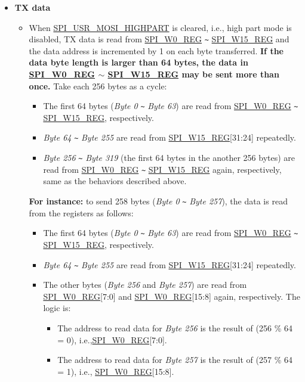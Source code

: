 \documentclass[main\_\_EN.tex]{subfiles}
\begin{document}
\begin{itemize}
    \item \textbf{TX data}
    \begin{itemize}
        \item When \hyperref[fielddesc:SPIUSRMOSIHIGHPART]{SPI\_USR\_MOSI\_HIGHPART} is cleared, i.e., high part mode is disabled, TX data is read from \hyperref[regdesc:SPIW0REG]{SPI\_W0\_REG} \verb+~+ \hyperref[regdesc:SPIW0REG]{SPI\_W15\_REG} and the data address is incremented by 1 on each byte transferred. \textbf{If the data byte length is larger than 64 bytes, the data in \hyperref[regdesc:SPIW0REG]{SPI\_W0\_REG} $\sim$ \hyperref[regdesc:SPIW0REG]{SPI\_W15\_REG} may be sent more than once.} Take each 256 bytes as a cycle:
        \begin{itemize}
            \item The first 64 bytes (\emph{Byte 0} \verb+~+ \emph{Byte 63}) are read from \hyperref[regdesc:SPIW0REG]{SPI\_W0\_REG} \verb+~+ \hyperref[regdesc:SPIW0REG]{SPI\_W15\_REG}, respectively.
            \item \emph{Byte 64} \verb+~+ \emph{Byte 255} are read from  \hyperref[regdesc:SPIW0REG]{SPI\_W15\_REG}[31:24] repeatedly.
            \item \emph{Byte 256} \verb+~+ \emph{Byte 319} (the first 64 bytes in the another 256 bytes) are read from \hyperref[regdesc:SPIW0REG]{SPI\_W0\_REG} \verb+~+ \hyperref[regdesc:SPIW0REG]{SPI\_W15\_REG} again, respectively, same as the behaviors described above.
        \end{itemize}
        \textbf{For instance:} to send 258 bytes (\emph{Byte 0} \verb+~+ \emph{Byte 257}), the data is read from the registers as follows:
        \begin{itemize}
            \item The first 64 bytes (\emph{Byte 0} \verb+~+ \emph{Byte 63}) are read from \hyperref[regdesc:SPIW0REG]{SPI\_W0\_REG} \verb+~+ \hyperref[regdesc:SPIW0REG]{SPI\_W15\_REG}, respectively.
            \item \emph{Byte 64} \verb+~+ \emph{Byte 255} are read from \hyperref[regdesc:SPIW0REG]{SPI\_W15\_REG}[31:24] repeatedly.
            \item The other bytes (\emph{Byte 256} and \emph{Byte 257}) are read from \hyperref[regdesc:SPIW0REG]{SPI\_W0\_REG}[7:0] and \hyperref[regdesc:SPIW0REG]{SPI\_W0\_REG}[15:8] again, respectively. The logic is:
            \begin{itemize}
                \item The address to read data for \emph{Byte 256} is the result of (256 \% 64 = 0), i.e.,\hyperref[regdesc:SPIW0REG]{SPI\_W0\_REG}[7:0].
                \item The address to read data for \emph{Byte 257} is the result of (257 \% 64 = 1), i.e., \hyperref[regdesc:SPIW0REG]{SPI\_W0\_REG}[15:8].
            \end{itemize}
        \end{itemize}


\end{itemize}
\end{itemize}
\end{document}
